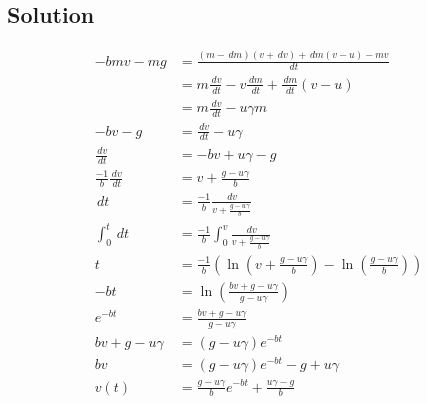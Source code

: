 \documentclass[solutions]{esg8012pset}
\renewcommand{\d}{\,d}
\begin{document}
\subsection{Solution}
  \begin{align*}
   -b m v - m g & = \frac{(m - \d m)(v + \d v) + \d m (v - u) - m v}{\d t} \\
    & = m\frac{\d v}{\d t} - v\frac{\d m}{\d t} + \frac{\d m}{\d t}(v - u) \\
    & = m\frac{\d v}{\d t} - u\gamma m \\
   -b v - g & = \frac{\d v}{\d t} - u\gamma \\
   \frac{\d v}{\d t} & = -b v + u\gamma - g \\
   \frac{-1}{b}\frac{\d v}{\d t} & = v + \frac{g - u\gamma}{b} \\
   \d t & =\frac{-1}{b}\frac{\d v}{v + \frac{g - u\gamma}{b}} \\
   \int_0^t \d t & = \frac{-1}{b}\int_{0}^{v}\frac{\d v}{v + \frac{g - u\gamma}{b}} \\
   t & = \frac{-1}{b}\left(\ln\left( v + \frac{g - u\gamma}{b}\right) - \ln\left(\frac{g - u\gamma}{b}\right)\right) \\
   -b t & = \ln\left( \frac{b v + g - u\gamma}{g - u\gamma}\right) \\
   e^{-b t} & = \frac{b v + g - u\gamma}{g - u\gamma} \\
   b v + g - u\gamma & = (g - u\gamma)e^{-b t} \\
   b v & = (g - u\gamma)e^{-b t} - g + u\gamma \\
   v(t) & = \frac{g - u\gamma}{b}e^{-b t} + \frac{u\gamma - g}{b}
  \end{align*}
\end{document}
